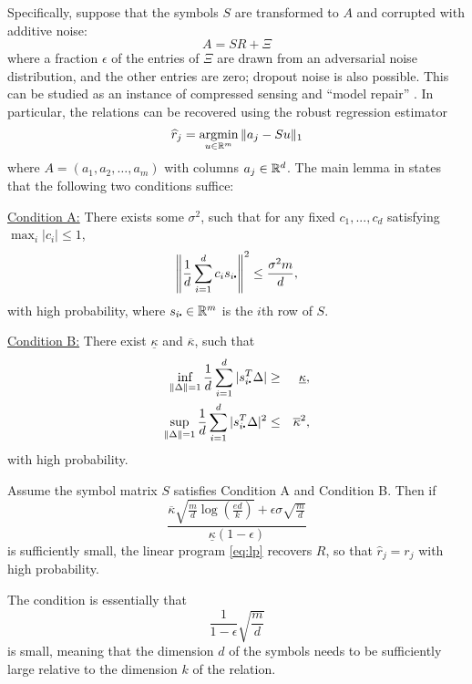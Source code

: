 Specifically, suppose that the symbols $S$ are transformed to $A$ and corrupted with additive noise:
\begin{equation}
  A = SR + \Xi
\end{equation}
where a fraction $\epsilon$ of the entries of $\Xi$ are drawn from an adversarial noise distribution, and the other entries are zero; dropout noise is also possible.
This can be studied as an instance of compressed sensing and ``model repair'' \citep{candes_randall,model_repair}.  In particular, the relations can be recovered using the  robust regression estimator
\begin{equation}
  \hat r_j = \argmin_{u \in\reals^m} \| a_j - S u\|_1 \label{eq:lp}
\end{equation}
where $A = (a_1,a_2,\ldots, a_m)$ with columns $a_j\in\mathbb{R}^d$.
The main lemma in \cite{model_repair} states that the following two conditions suffice:

\underline{Condition A:}
  There exists some $\sigma^2$, such that for any fixed $c_1,...,c_d$ satisfying $\max_i|c_i|\leq 1$,
  \begin{equation}
    \left\|\frac{1}{d}\sum_{i=1}^d c_i s_{i\rdot} \right\|^2\leq \frac{\sigma^2 m}{d},
  \end{equation}
with high probability, where $s_{i\rdot}\in\reals^m$ is the $i$th row of $S$.

\underline{Condition B:}
  There exist $\underline{\kappa}$ and $\overline{\kappa}$, such that
  \begin{eqnarray}
  \label{eq:l1-upper-A} \inf_{\|\Delta\|=1}\frac{1}{d}\sum_{i=1}^d|s_{i\rdot}^T\Delta| &\geq& \underline{\kappa}, \\
  \label{eq:l2-upper-A} \sup_{\|\Delta\|=1}\frac{1}{d}\sum_{i=1}^d|s_{i\rdot}^T\Delta|^2 &\leq& \overline{\kappa}^2,
  \end{eqnarray}
  with high probability.

\begin{thm}\label{thm:main-improved}
  Assume the symbol matrix $S$ satisfies Condition A and Condition B. Then if
  \begin{equation}
  \frac{\overline{\kappa}\sqrt{\frac{m}{d}\log\left(\frac{e d}{k}\right)}+\epsilon\sigma\sqrt{\frac{m}{d}}}{\underline{\kappa}(1-\epsilon)}
  \end{equation}
  is sufficiently small, the linear program \eqref{eq:lp} recovers $R$, so that $\hat r_j = r_j$ with high probability.
  \end{thm}

The condition is essentially that
  \begin{equation}
    \frac{1}{1-\epsilon} \sqrt{\frac{m}{d}}
  \end{equation}
  is small, meaning that the dimension $d$ of the symbols needs to be sufficiently large relative
  to the dimension $k$ of the relation.

